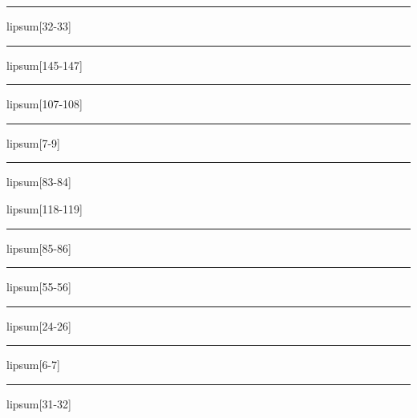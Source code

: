 \documentclass[11pt,a4paper]{article}
\begin{document}
\begin{simplewrap}
  \textcolor{magenta!41}{\rule{4.4cm}{2.9cm}}
\end{simplewrap}
lipsum[32-33]

\begin{simplewrap}
  \textcolor{yellow!28}{\rule{3.5cm}{3.3cm}}
\end{simplewrap}
lipsum[145-147]

\begin{simplewrap}
  \textcolor{yellow!47}{\rule{6.0cm}{2.0cm}}
\end{simplewrap}
lipsum[107-108]

\begin{simplewrap}
  \textcolor{magenta!59}{\rule{4.5cm}{2.8cm}}
\end{simplewrap}
lipsum[7-9]

\begin{simplewrap}
  \textcolor{orange!35}{\rule{4.1cm}{9.4cm}}
\end{simplewrap}
lipsum[83-84]

lipsum[118-119]

\begin{simplewrap}
  \textcolor{red!39}{\rule{4.9cm}{4.2cm}}
\end{simplewrap}
lipsum[85-86]

\begin{simplewrap}
  \textcolor{blue!30}{\rule{5.8cm}{10.0cm}}
\end{simplewrap}
lipsum[55-56]

\begin{simplewrap}
  \textcolor{violet!30}{\rule{5.4cm}{8.0cm}}
\end{simplewrap}
lipsum[24-26]

\begin{simplewrap}
  \textcolor{cyan!25}{\rule{5.9cm}{8.9cm}}
\end{simplewrap}
lipsum[6-7]

\begin{simplewrap}
  \textcolor{cyan!34}{\rule{5.3cm}{4.3cm}}
\end{simplewrap}
lipsum[31-32]
\end{document}
